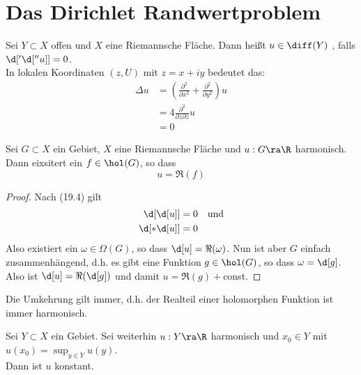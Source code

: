
\section{Das Dirichlet Randwertproblem}
\label{sec:Dirichlet}


\begin{defin}
  Sei $Y \subset X$ offen und $X$ eine Riemannsche Fläche. Dann heißt
  $u \in \diff(Y)$ , falls $\d['\d[''u]] = 0$. \\
  In lokalen Koordinaten $(z,U)$ mit $z = x + iy$ bedeutet das:
  \begin{align*}
    \Delta u & = \left ( \frac{\partial^2}{\partial x^2} +
      \frac{\partial^2}{\partial y^2} \right ) u \\
    & = 4 \frac{\partial^2}{\partial z \partial \bar z} u \\
    & = 0
  \end{align*}
\end{defin}

\begin{prop}
  \label{prop:harm-realteil-hol}
  Sei $G \subset X$ ein Gebiet, $X$ eine Riemannsche Fläche
  und $u: G \ra \R$ harmonisch. \\
  Dann eixsitert ein $f \in \hol(G)$, so dass
  \[
  u = \Re(f)
  \]
\end{prop}

\begin{proof}
  Nach (19.4) gilt
  \begin{align*}
    \d[\d[u]] & = 0 && \text{und}\\
    \d[\ast\d[u]] & = 0
  \end{align*}
  Also existiert ein $\omega \in \Omega(G)$, so dass $\d[u] =
  \Re(\omega)$. Nun ist aber $G$ einfach zusammenhängend, d.h. es gibt
  eine Funktion $g \in \hol(G)$, so dass $\omega = \d[g]$.\\
  Also ist $\d[u] = \Re(\d[g])$ und damit $u = \Re(g) +$const.
\end{proof}

\begin{rem}
  Die Umkehrung gilt immer, d.h. der Realteil einer holomorphen
  Funktion ist immer harmonisch.
\end{rem}

\begin{prop}
  \label{prop:max-prinzip-harm}
  Sei $Y \subset X$ ein Gebiet. Sei weiterhin $u: Y \ra \R$ harmonisch
  und $x_0 \in Y$ mit $u(x_0) = \sup_{y \in Y} u(y)$. \\
  Dann ist $u$ konstant.
\end{prop}

